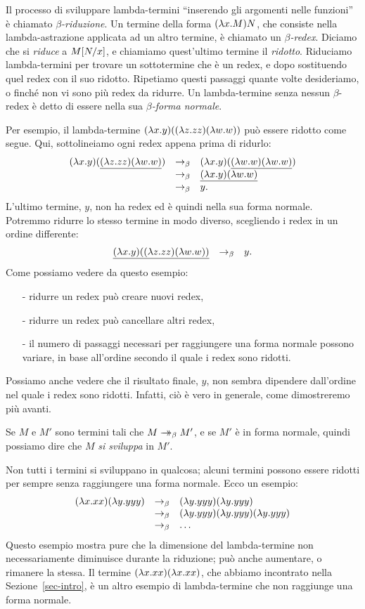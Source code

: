 \documentclass{article}
\begin{document}
Il processo di sviluppare lambda-termini ``inserendo gli argomenti
nelle funzioni'' \`e chiamato {\em $\beta$-riduzione}. Un termine della
forma $(\lambda x.M)N$, che consiste nella lambda-astrazione applicata ad un
altro termine, \`e chiamato un {\em $\beta$-redex}. Diciamo che si
{\em riduce} a $M[N/x]$, e chiamiamo quest'ultimo termine il {\em
  ridotto}. Riduciamo lambda-termini per trovare un sottotermine che \`e
un redex, e dopo sostituendo quel redex con il suo ridotto. Ripetiamo
questi passaggi quante volte desideriamo, o finché non vi sono pi\`u redex
da ridurre. Un lambda-termine senza nessun $\beta$-redex \`e detto di essere
nella sua {\em $\beta$-forma normale}.

Per esempio, il lambda-termine $(\lambda x.y)((\lambda z.zz)(\lambda w.w))$ pu\`o
essere ridotto come segue. Qui, sottolineiamo ogni redex appena prima
di ridurlo:
\[ \begin{array}{lll}
  (\lambda x.y)(\underline{(\lambda z.zz)(\lambda w.w)}) 
  &\rightarrow_{\beta}& (\lambda x.y)(\underline{(\lambda w.w)(\lambda w.w)}) \\
  &\rightarrow_{\beta}& \underline{(\lambda x.y)(\lambda w.w)} \\
  &\rightarrow_{\beta}& y.
\end{array}
\]
L'ultimo termine, $y$, non ha redex ed \`e quindi nella sua forma normale.
Potremmo ridurre lo stesso termine in modo diverso, scegliendo i redex
in un ordine differente:
\[ \begin{array}{lll}
  \underline{(\lambda x.y)((\lambda z.zz)(\lambda w.w))}
  &\rightarrow_{\beta}& y.
\end{array}
\]
Come possiamo vedere da questo esempio:
\begin{itemize}
\item[-] ridurre un redex pu\`o creare nuovi redex,
\item[-] ridurre un redex pu\`o cancellare altri redex,
\item[-] il numero di passaggi necessari per raggiungere una forma normale
possono variare, in base all'ordine secondo il quale i redex sono ridotti.
\end{itemize}
Possiamo anche vedere che il risultato finale, $y$, non sembra dipendere
dall'ordine nel quale i redex sono ridotti. Infatti, ci\`o \`e vero in generale,
come dimostreremo pi\`u avanti.

Se $M$ e $M'$ sono termini tali che $M\mathrel{\rightarrow\!\!\!\!\!\rightarrow}_{\beta} M'$, e se $M'$ \`e in
forma normale, quindi possiamo dire che $M$ {\em si sviluppa} in $M'$.

Non tutti i termini si sviluppano in qualcosa; alcuni termini
possono essere ridotti per sempre senza raggiungere una forma normale.
Ecco un esempio:
\[ \begin{array}{lll}
  (\lambda x.xx)(\lambda y.yyy) 
  &\rightarrow_{\beta}& (\lambda y.yyy)(\lambda y.yyy) \\
  &\rightarrow_{\beta}& (\lambda y.yyy)(\lambda y.yyy)(\lambda y.yyy) \\
  &\rightarrow_{\beta}& \ldots
\end{array}
\]
Questo esempio mostra pure che la dimensione del lambda-termine non
necessariamente diminuisce durante la riduzione; pu\`o anche aumentare,
o rimanere la stessa. Il termine $(\lambda x.xx)(\lambda x.xx)$, che abbiamo
incontrato nella Sezione~\ref{sec-intro}, \`e un altro esempio di
lambda-termine che non raggiunge una forma normale.
\end{document}
